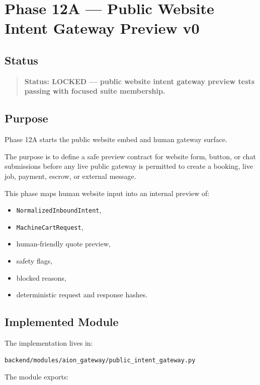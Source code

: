 \section{Phase 12A --- Public Website Intent Gateway Preview v0}
\label{sec:aion-public-intent-gateway-preview-v0}

\subsection{Status}

\begin{quote}
\textbf{Status: LOCKED --- public website intent gateway preview tests passing with focused suite membership.}
\end{quote}

\subsection{Purpose}

Phase 12A starts the public website embed and human gateway surface.

The purpose is to define a safe preview contract for website form, button, or chat submissions before any live public gateway is permitted to create a booking, live job, payment, escrow, or external message.

This phase maps human website input into an internal preview of:

\begin{itemize}
  \item \texttt{NormalizedInboundIntent},
  \item \texttt{MachineCartRequest},
  \item human-friendly quote preview,
  \item safety flags,
  \item blocked reasons,
  \item deterministic request and response hashes.
\end{itemize}

\subsection{Implemented Module}

The implementation lives in:

\begin{verbatim}
backend/modules/aion_gateway/public_intent_gateway.py
\end{verbatim}

The module exports:


